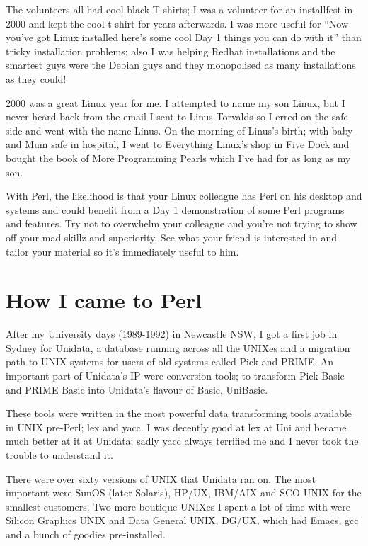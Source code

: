 \documentclass{article}
\begin{document}
The volunteers all had cool black T-shirts; I was a volunteer for an
installfest in 2000 and kept the cool t-shirt for years afterwards.
I was more useful for ``Now you've got Linux installed here's some
cool Day 1 things you can do with it'' than tricky installation
problems; also I was helping Redhat installations and the smartest
guys were the Debian guys and they monopolised as many installations
as they could!

2000 was a great Linux year for me. I attempted to name my son Linux,
but I never heard back from the email I sent to Linus Torvalds so I
erred on the safe side and went with the name Linus. On the morning of
Linus's birth; with baby and Mum safe in hospital, I went to
Everything Linux's shop in Five Dock and bought the book of
More Programming Pearls which I've had for as long as my son.

With Perl, the likelihood is that your Linux colleague has Perl on
his desktop and systems and could benefit from a Day 1 demonstration
of some Perl programs and features. Try not to overwhelm your
colleague and you're not trying to show off your mad skillz and
superiority. See what your friend is interested in and tailor your
material so it's immediately useful to him.

\section{How I came to Perl}

After my University days (1989-1992) in Newcastle NSW, I got a first
job in Sydney for Unidata, a database running across all the UNIXes
and a migration path to UNIX systems for users of old systems called
Pick and PRIME. An important part of Unidata's IP were conversion
tools; to transform Pick Basic and PRIME Basic into Unidata's flavour
of Basic, UniBasic.

These tools were written in the most powerful data transforming tools
available in UNIX pre-Perl; lex and yacc. I was decently good at lex
at Uni and became much better at it at Unidata; sadly yacc always
terrified me and I never took the trouble to understand it.

There were over sixty versions of UNIX that Unidata ran on. The most
important were SunOS (later Solaris), HP/UX, IBM/AIX and SCO UNIX for
the smallest customers. Two more boutique UNIXes I spent a lot of time
with were Silicon Graphics UNIX and Data General UNIX, DG/UX, which
had Emacs, gcc and a bunch of goodies pre-installed.
\end{document}
